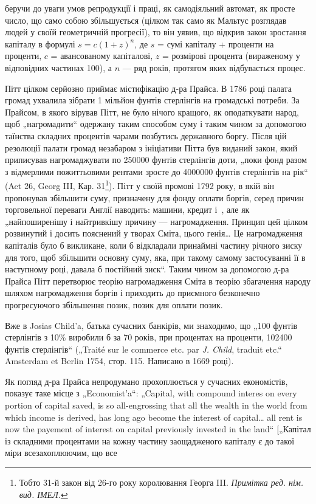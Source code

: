 \parcont{}  %
беручи до уваги умов репродукції і праці, як самодіяльний
автомат, як просте число, що само собою збільшується (цілком
так само як Мальтус розглядав людей у своїй геометричній
прогресії), то він уявив, що відкрив закон зростання капіталу
в формулі $s = c (1 + z)^n$, де $s$ = сумі капіталу + проценти на
проценти, $c$ = авансованому капіталові, $z$ = розмірові процента
(вираженому у відповідних частинах 100), а $n$ — ряд років, протягом
яких відбувається процес.

Пітт цілком серйозно приймає містифікацію д-ра Прайса.
В 1786 році палата громад ухвалила зібрати 1 мільйон фунтів стерлінгів
на громадські потреби. За Прайсом, в якого вірував Пітт,
не було нічого кращого, як оподаткувати народ, щоб „нагромадити“
одержану таким способом суму і таким чином за допомогою
таїнства складних процентів чарами позбутись державного
боргу. Після цій резолюції палати громад незабаром з ініціативи
Пітта був виданий закон, який приписував нагромаджувати по
\num{250000} фунтів стерлінгів доти, „поки фонд разом з відмерлими
пожиттьовими рентами зросте до \num{4000000} фунтів стерлінгів
на рік“ (Act 26, Georg III, Кар. 31\footnote*{
Тобто 31-й закон від 26-го року королювання Георга III.
\emph{Примітка ред. нім. вид. ІМЕЛ.}
}). Пітт у своїй промові 1792 року,
в якій він пропонував збільшити суму, призначену для фонду
оплати боргів, серед причин торговельної переваги Англії наводить:
машини, кредит і~, але як „найпоширенішу і найтривкішу
причину — нагромадження. Принцип цей цілком розвинутий
і досить пояснений у творах Сміта, цього генія\dots{} Це нагромадження
капіталів було б викликане, коли б відкладали принаймні
частину річного зиску для того, щоб збільшити основну
суму, яка, при такому самому застосуванні її в наступному році,
давала б постійний зиск“. Таким чином за допомогою д-ра Прайса
Пітт перетворює теорію нагромадження Сміта в теорію збагачення
народу шляхом нагромадження боргів і приходить до
приємного безконечно прогресуючого збільшення позик, позик
для оплати позик.

Вже в Josias Child’a, батька сучасних банкірів, ми знаходимо,
що „100 фунтів стерлінгів з 10\% виробили б за 70 років, при
процентах на проценти, \num{102400} фунтів стерлінгів“ („Traité sur le
commerce etc. par \emph{J. Child}, traduit etc.“ Amsterdam et Berlin
1754, стор. 115. Написано в 1669 році).

Як погляд д-ра Прайса непродумано прохоплюється у сучасних
економістів, показує таке місце з „Economist’a“: „Capital,
with compound interes on every portion of capital saved, is so
all-engrossing that all the wealth in the world from which income
is derived, has long ago become the interest of capital\dots{} all rent is
now the payement of interest on capital previously invested in the
land“ [„Капітал із складними процентами на кожну частину заощадженого
капіталу є до такої міри всезахоплюючим, що все
\parbreak{}  %
